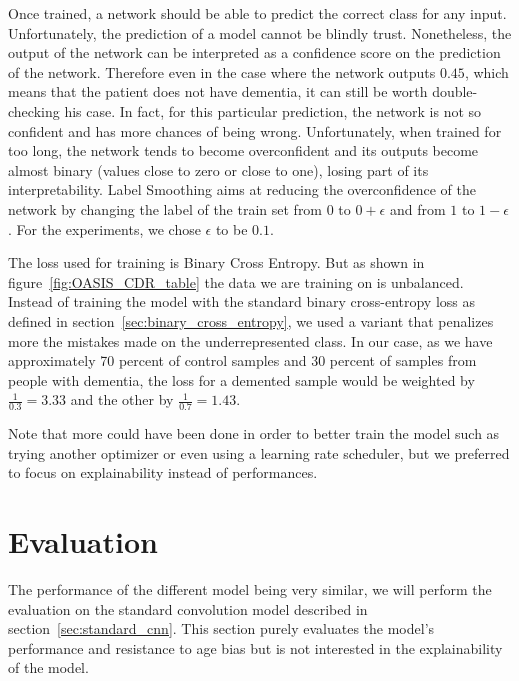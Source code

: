 Once trained, a network should be able to predict the correct class for any input. Unfortunately, the prediction of a model cannot be blindly trust. Nonetheless, the output of the network can be interpreted as a confidence score on the prediction of the network. Therefore even in the case where the network outputs $0.45$, which means that the patient does not have dementia, it can still be worth double-checking his case. In fact, for this particular prediction, the network is not so confident and has more chances of being wrong. Unfortunately, when trained for too long, the network tends to become overconfident and its outputs become almost binary (values close to zero or close to one), losing part of its interpretability. Label Smoothing \cite{label_smoothing_szegedy2015rethinking} aims at reducing the overconfidence of the network by changing the label of the train set from $0$ to $0 + \epsilon$ and from $1$ to $1 - \epsilon$. For the experiments, we chose $\epsilon$ to be $0.1$.

The loss used for training is Binary Cross Entropy. But as shown in figure~\ref{fig:OASIS_CDR_table} the data we are training on is unbalanced. Instead of training the model with the standard binary cross-entropy loss as defined in section~\ref{sec:binary_cross_entropy}, we used a variant that penalizes more the mistakes made on the underrepresented class. In our case, as we have approximately 70 percent of control samples and 30 percent of samples from people with dementia, the loss for a demented sample would be weighted by $\frac{1}{0.3} = 3.33$ and the other by $\frac{1}{0.7} = 1.43$.

Note that more could have been done in order to better train the model such as trying another optimizer or even using a learning rate scheduler, but we preferred to focus on explainability instead of performances.

\section{Evaluation}
The performance of the different model being very similar, we will perform the evaluation on the standard convolution model described in section~\ref{sec:standard_cnn}. This section purely evaluates the model's performance and resistance to age bias but is not interested in the explainability of the model. 



